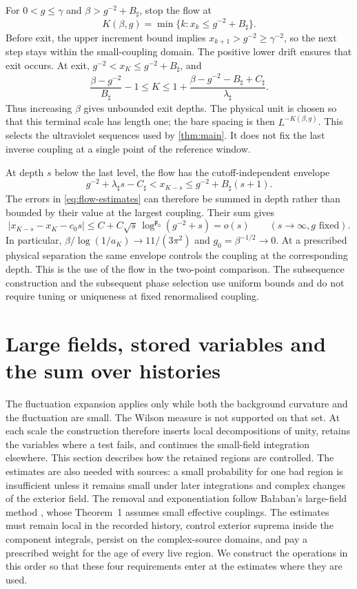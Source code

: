 \documentclass[11pt,letterpaper,reqno]{amsart}
\theoremstyle{definition}
\theoremstyle{remark}
\begin{document}
For $0<g\le\gamma$ and $\beta>g^{-2}+B_\sharp$, stop the flow at
\begin{equation}\label{eq:first-passage}
 K(\beta,g)=\min\{k:x_k\le g^{-2}+B_\sharp\}.
\end{equation}
Before exit, the upper increment bound implies
$x_{k+1}>g^{-2}\ge\gamma^{-2}$, so the next step stays
within the small-coupling domain. The positive lower drift
ensures that exit occurs. At exit,
$g^{-2}<x_K\le g^{-2}+B_\sharp$, and
\[
 \frac{\beta-g^{-2}}{B_\sharp}-1\le K
 \le1+\frac{\beta-g^{-2}-B_\sharp+C_\sharp}
                 {\lambda_\sharp}.
\]
Thus increasing $\beta$ gives unbounded exit depths. The
physical unit is chosen so that this terminal scale has
length one; the bare spacing is then $L^{-K(\beta,g)}$.
This selects the ultraviolet sequences used by
\cref{thm:main}. It does not fix the last inverse coupling
at a single point of the reference window.

At depth $s$ below the last level, the flow has the
cutoff-independent envelope
\[
 g^{-2}+\lambda_\sharp s-C_\sharp
 <x_{K-s}\le g^{-2}+B_\sharp(s+1).
\]
The errors in \eqref{eq:flow-estimates} can therefore be
summed in depth rather than bounded by their value at the
largest coupling. Their sum gives
\[
 |x_{K-s}-x_K-c_0s|
 \le C+C\sqrt{s}\,
                 \log^{\mathfrak p_0}(g^{-2}+s)=o(s)
 \qquad(s\longrightarrow\infty, g\text{ fixed}).
\]
In particular,
$\beta/\log(1/a_K)\longrightarrow 11/(3\pi^2)$ and
$g_0=\beta^{-1/2}\longrightarrow0$.
At a prescribed physical separation the same envelope
controls the coupling at the corresponding depth. This is
the use of the flow in the two-point comparison. The
subsequence construction and the subsequent phase
selection use uniform bounds and do not require tuning
or uniqueness at fixed renormalised coupling.

\section{Large fields, stored variables and the sum over histories}\label{sec:large-fields}

The fluctuation expansion applies only while both the background
curvature and the fluctuation are small. The Wilson measure is not
supported on that set. At each scale the construction therefore inserts
local decompositions of unity, retains the variables where a test fails,
and continues the small-field integration elsewhere. This section
describes how the retained regions are controlled. The estimates are
also needed with sources: a small probability for one bad region is
insufficient unless it remains small under later integrations and
complex changes of the exterior field.
The removal and exponentiation follow Ba\l aban's large-field method
\cite{Balaban1989}, whose Theorem~1 assumes small effective couplings.
The estimates must remain local in the recorded history, control
exterior suprema inside the component integrals, persist on the
complex-source domains, and pay a prescribed weight for the age of
every live region. We construct the operations in this order so that
these four requirements enter at the estimates where they are used.
\end{document}
